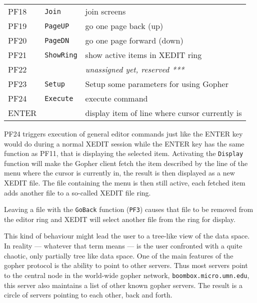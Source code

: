\begin{table}
\begin{center}
\begin{tabular}{|l|l|l|}
PF18    & {\tt Join}        & join screens                                  \\
PF19    & {\tt PageUP}      & go one page back (up)                         \\
PF20    & {\tt PageDN}      & go one page forward (down)                    \\
\hline
PF21    & {\tt ShowRing}    & show active items in XEDIT ring               \\
PF22    &                   & {\it unassigned yet, reserved ***}            \\
PF23    & {\tt Setup}       & Setup some parameters for using Gopher        \\
PF24    & {\tt Execute}     & execute command                               \\
\hline\hline
ENTER   &                   & display item of line where cursor currently is\\
\hline
\end{tabular}
\end{center}
\end{table}




PF24 triggers execution of general editor commands just like the ENTER
key would do during a normal XEDIT session while the ENTER key has the
same function as PF11, that is displaying the selected item.
Activating the {\tt Display} function will make the
Gopher client fetch the item described by the line of the menu where
the cursor is currently in, the result is then displayed as a new XEDIT
file. The file containing the menu is then still active, each fetched
item adds another file to a so-called XEDIT file ring.

Leaving a file with the {\tt GoBack} function ({\tt PF3}) causes that file
to be removed from the editor ring and XEDIT will select another file from
the ring for display.

This kind of behaviour might lead the user to a tree-like view of the
data space.  In reality --- whatever that term means --- is the user
confronted with a quite chaotic, only partially tree like data space.
One of the main features of the gopher protocol is the ability to point
to other servers.  Thus most servers point to the central node in the
world-wide gopher network, {\tt boombox.micro.umn.edu}, this server also
maintains a list of other known gopher servers.  The result is a circle
of servers pointing to each other, back and forth.



